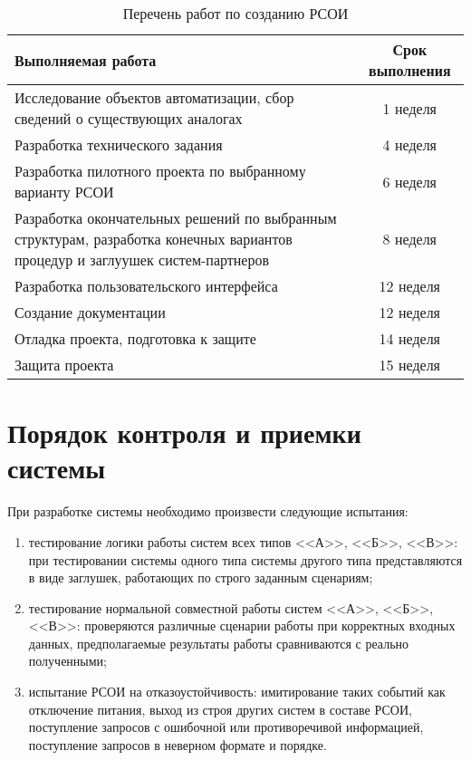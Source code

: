 \begin{table}[ht]
  \caption{Перечень работ по созданию РСОИ}
  \begin{tabular}{|p{}|c|}
  \hline
  Выполняемая работа & Срок выполнения\\
  \hline
  Исследование объектов автоматизации, сбор сведений о существующих аналогах & 1 неделя \\
  \hline
  Разработка технического задания & 4 неделя \\
  \hline
  Разработка пилотного проекта по выбранному варианту РСОИ & 6 неделя \\
  \hline
  Разработка окончательных решений по выбранным структурам, разработка конечных вариантов процедур и заглуушек систем-партнеров & 8 неделя \\
  \hline
  Разработка пользовательского интерфейса & 12 неделя \\ 
  \hline
   Создание документации & 12 неделя \\
  \hline
  Отладка проекта, подготовка к защите & 14 неделя \\
  \hline
  Защита проекта & 15 неделя\\
  \hline
  \end{tabular}
  \label{tab:sostav}
\end{table}


\section{Порядок контроля и приемки системы}
При разработке системы необходимо произвести следующие испытания:
\begin{enumerate}
	\item тестирование логики работы систем всех типов <<А>>, <<Б>>, <<В>>: при тестировании системы одного типа системы другого типа представляются в виде заглушек, работающих по строго заданным сценариям;
	\item тестирование нормальной совместной работы систем <<А>>, <<Б>>, <<В>>: проверяются различные сценарии работы при корректных входных данных, предполагаемые результаты работы сравниваются с реально полученными;
	\item испытание РСОИ на отказоустойчивость: имитирование таких событий как отключение питания, выход из строя других систем в составе РСОИ, поступление запросов с ошибочной или противоречивой информацией, поступление запросов в неверном формате и порядке.
\end{enumerate}


